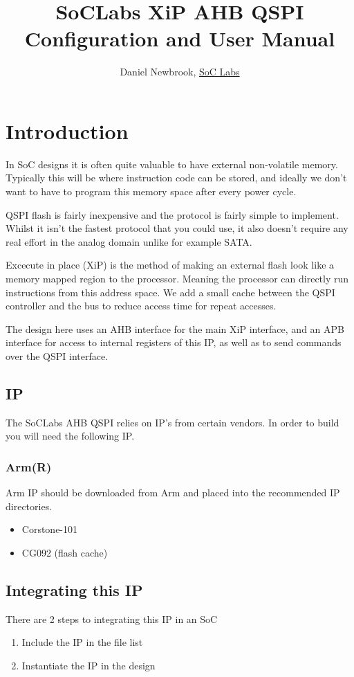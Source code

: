 \documentclass{report}
\title{SoCLabs XiP AHB QSPI Configuration and User Manual}
\author{Daniel Newbrook, \href{http://www.soclabs.org}{SoC Labs}}
\begin{document}
\maketitle
\tableofcontents
\clearpage
\chapter{Introduction}
In SoC designs it is often quite valuable to have external non-volatile memory. Typically this will be 
where instruction code can be stored, and ideally we don't want to have to program this memory space after 
every power cycle. 

QSPI flash is fairly inexpensive and the protocol is fairly simple to implement. Whilst it isn't the fastest
protocol that you could use, it also doesn't require any real effort in the analog domain unlike for example SATA.

Excecute in place (XiP) is the method of making an external flash look like a memory mapped region to the processor.
Meaning the processor can directly run instructions from this address space. We add a small cache between the 
QSPI controller and the bus to reduce access time for repeat accesses. 

The design here uses an AHB interface for the main XiP interface, and an APB interface for access to internal 
registers of this IP, as well as to send commands over the QSPI interface.

\section{IP}
The SoCLabs AHB QSPI relies on IP's from certain vendors. In order to build you will need the following IP.
\subsection{Arm(R)}
Arm IP should be downloaded from Arm and placed into the recommended IP directories.
\begin{itemize}
    \item Corstone-101
    \item CG092 (flash cache)
\end{itemize}

\section{Integrating this IP}
There are 2 steps to integrating this IP in an SoC 
\begin{enumerate}
    \item Include the IP in the file list
    \item Instantiate the IP in the design
\end{enumerate}
\end{document}
